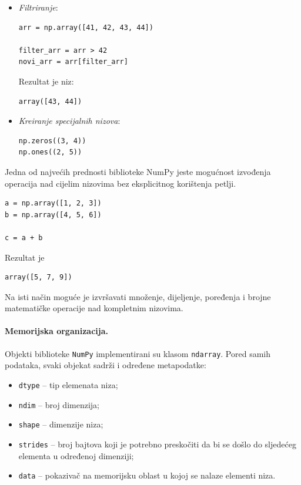 \begin{itemize}
	\item \textit{Filtriranje}:
	
	\begin{verbatim}
arr = np.array([41, 42, 43, 44])

filter_arr = arr > 42
novi_arr = arr[filter_arr]
\end{verbatim}
	
	Rezultat je niz:
	
	\begin{verbatim}
array([43, 44])
\end{verbatim}
	
	\item \textit{Kreiranje specijalnih nizova}:
	
	\begin{verbatim}
np.zeros((3, 4))
np.ones((2, 5))
\end{verbatim}
	
\end{itemize}


Jedna od najvećih prednosti biblioteke NumPy jeste mogućnost izvođenja operacija nad cijelim nizovima bez eksplicitnog korištenja petlji.

\begin{verbatim}
a = np.array([1, 2, 3])
b = np.array([4, 5, 6])

c = a + b
\end{verbatim}

Rezultat je

\begin{verbatim}
array([5, 7, 9])
\end{verbatim}

Na isti način moguće je izvršavati množenje, dijeljenje, poređenja i brojne matematičke operacije nad kompletnim nizovima.

\paragraph{Memorijska organizacija.} Objekti biblioteke \texttt{NumPy} implementirani su klasom \texttt{ndarray}. Pored samih podataka, svaki objekat sadrži i određene metapodatke:

\begin{itemize}
	\item \texttt{dtype} -- tip elemenata niza;
	\item \texttt{ndim} -- broj dimenzija;
	\item \texttt{shape} -- dimenzije niza;
	\item \texttt{strides} -- broj bajtova koji je potrebno preskočiti da bi se došlo do sljedećeg elementa u određenoj dimenziji;
	\item \texttt{data} -- pokazivač na memorijsku oblast u kojoj se nalaze elementi niza.
\end{itemize}

